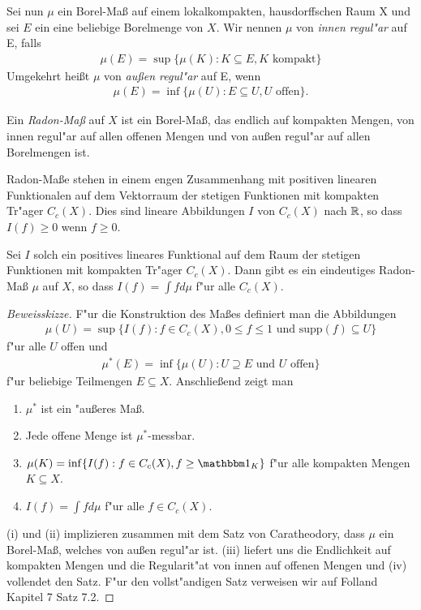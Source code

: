 	Sei nun $\mu$ ein Borel-Maß auf einem lokalkompakten, hausdorffschen Raum X und sei $E$ ein eine beliebige Borelmenge von $X$.
	Wir nennen $\mu$ von \emph{innen regul"ar} auf E, falls
	\begin{align*}
		\mu(E) = \sup\{\mu(K): K \subseteq E, K \text{ kompakt}\}
	\end{align*}
	Umgekehrt heißt $\mu$ von \emph{außen regul"ar} auf E, wenn
	\begin{align*}
		\mu(E) = \inf\{\mu(U): E \subseteq U, U \text{ offen}\}.
	\end{align*}
	
	\begin{defi}
		Ein \emph{Radon-Maß} auf $X$ ist ein Borel-Maß, das endlich auf kompakten Mengen, von innen regul"ar auf allen offenen Mengen und von außen regul"ar auf allen Borelmengen ist.
	\end{defi}
	Radon-Maße stehen in einem engen Zusammenhang mit positiven linearen Funktionalen auf dem Vektorraum der stetigen Funktionen mit kompakten Tr"ager $C_c(X)$.
	Dies sind lineare Abbildungen $I$ von $C_c(X)$ nach $\mathbb{R}$, so dass $I(f) \geq 0$ wenn $f\geq 0$.
	\begin{satz}
		Sei $I$ solch ein positives lineares Funktional auf dem Raum der stetigen Funktionen mit kompakten Tr"ager $C_c(X)$.
		Dann gibt es ein eindeutiges Radon-Maß $\mu$ auf $X$, so dass $I(f) = \int f d\mu$ f"ur alle $C_c(X)$.
	\end{satz}
	\begin{proof}[Beweisskizze]
		F"ur die Konstruktion des Maßes definiert man die Abbildungen
		\begin{align*}
			\mu(U) = \sup\{I(f): f\in C_c(X), 0\leq f\leq 1 \text{ und } \text{supp}(f) \subseteq U\}
		\end{align*}
		f"ur alle $U$ offen und
		\begin{align*}
			\mu^*(E) = \inf \{ \mu(U): U\supseteq E \text{ und } U \text{ offen}\}
		\end{align*}
		f"ur beliebige Teilmengen $E\subseteq X$. 
		Anschließend zeigt man
		\begin{enumerate}[label=(\roman*)]
			\item $\mu^*$ ist ein "außeres Maß.
			\item Jede offene Menge ist $\mu^*$-messbar.
			\item $\mu(K) = \inf\{I(f): f\in C_c(X), f\geq \ind_K\}$ f"ur alle kompakten Mengen $K \subseteq X$.
			\item $I(f) = \int f d\mu$ f"ur alle $f\in C_c(X)$.
		\end{enumerate}
		(i) und (ii) implizieren zusammen mit dem Satz von Caratheodory, dass $\mu$ ein Borel-Maß, welches von außen regul"ar ist.
		(iii) liefert uns die Endlichkeit auf kompakten Mengen und die Regularit"at von innen auf offenen Mengen und (iv) vollendet den Satz.
		F"ur den vollst"andigen Satz verweisen wir auf Folland \cite{folland} Kapitel 7 Satz 7.2.
	\end{proof}
